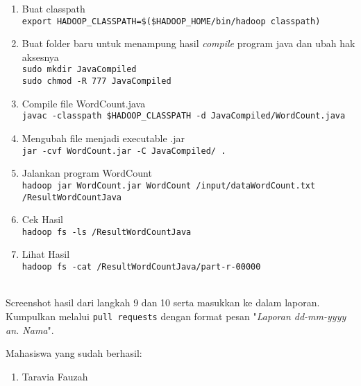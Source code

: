 \documentclass[a4paper]{tufte-handout}
\begin{document}
\begin{enumerate}
\item Buat classpath \\
{\tt export HADOOP\_CLASSPATH=\$(\$HADOOP\_HOME/bin/hadoop classpath)}

\item Buat folder baru untuk menampung hasil \textit{compile} program java dan ubah hak aksesnya \\
{\tt sudo mkdir JavaCompiled} \\
{\tt sudo chmod -R 777 JavaCompiled}

\item Compile file WordCount.java \\
{\tt \small{javac -classpath \$HADOOP\_CLASSPATH -d JavaCompiled/WordCount.java}}

\item Mengubah file menjadi executable .jar \\
{\tt jar -cvf WordCount.jar -C JavaCompiled/ .}

\item Jalankan program WordCount \\
{\tt hadoop jar WordCount.jar WordCount /input/dataWordCount.txt /ResultWordCountJava}

\item Cek Hasil \\
{\tt hadoop fs -ls /ResultWordCountJava}

\item Lihat Hasil \\
{\tt hadoop fs -cat /ResultWordCountJava/part-r-00000}
\end{enumerate}

 \\
Screenshot hasil dari langkah 9 dan 10 serta masukkan ke dalam laporan. Kumpulkan melalui {\tt pull requests} dengan format pesan "\textit{Laporan dd-mm-yyyy an. Nama}".

\noindent
Mahasiswa yang sudah berhasil:
\begin{multicols}{2}
\begin{enumerate}
\item Taravia Fauzah
\end{enumerate}
\end{multicols}

\hrulefill
\end{document}
